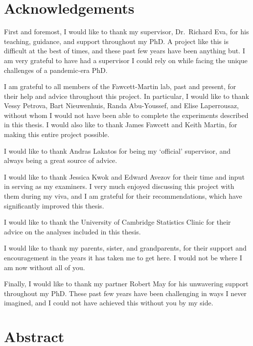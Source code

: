 \documentclass[
  12pt,
  a4paper,
]{book}
\begin{document}
\hypertarget{ACKNOWLEDGEMENTS}{%
\chapter*{Acknowledgements}\label{ACKNOWLEDGEMENTS}}


First and foremost, I would like to thank my supervisor, Dr.~Richard Eva, for his teaching, guidance, and support throughout my PhD. A project like this is difficult at the best of times, and these past few years have been anything but. I am very grateful to have had a supervisor I could rely on while facing the unique challenges of a pandemic-era PhD.

I am grateful to all members of the Fawcett-Martin lab, past and present, for their help and advice throughout this project. In particular, I would like to thank Vessy Petrova, Bart Nieuwenhuis, Randa Abu-Youssef, and Elise Laperrousaz, without whom I would not have been able to complete the experiments described in this thesis. I would also like to thank James Fawcett and Keith Martin, for making this entire project possible.

I would like to thank Andras Lakatos for being my `official' supervisor, and always being a great source of advice.

I would like to thank Jessica Kwok and Edward Avezov for their time and input in serving as my examiners. I very much enjoyed discussing this project with them during my viva, and I am grateful for their recommendations, which have significantly improved this thesis.

I would like to thank the University of Cambridge Statistics Clinic for their advice on the analyses included in this thesis.

I would like to thank my parents, sister, and grandparents, for their support and encouragement in the years it has taken me to get here. I would not be where I am now without all of you.

Finally, I would like to thank my partner Robert May for his unwavering support throughout my PhD. These past few years have been challenging in ways I never imagined, and I could not have achieved this without you by my side.

\hypertarget{ABSTRACT}{%
\chapter*{Abstract}\label{ABSTRACT}}
\end{document}
